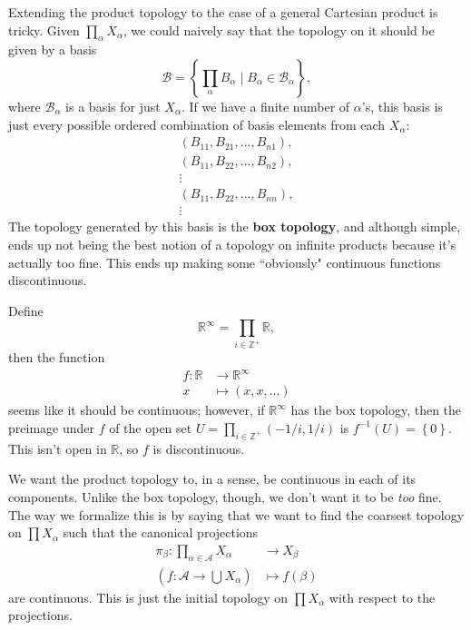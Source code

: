 \documentclass[twoside,10pt]{report}
\begin{document}
Extending the product topology to the case of a general Cartesian product is tricky. Given $\prod_{\alpha} X_{\alpha}$, we could naively say that the topology on it should be given by a basis
\[
	\mathcal{B} = \left\{ \prod_{\alpha}B_{\alpha}\;\Big|\; B_{\alpha} \in \mathcal{B}_{\alpha} \right\},
\] where $\mathcal{B}_{\alpha}$ is a basis for just $X_{\alpha}$. If we have a finite number of $\alpha$'s, this basis is just every possible ordered combination of basis elements from each $X_{\alpha}$:
\begin{gather*}
	(B_{11}, B_{21}, \dots, B_{n 1}), \\
	(B_{11}, B_{22}, \dots, B_{n 2}), \\
	\vdots \\
	(B_{11}, B_{22}, \dots, B_{n n}), \\
	\vdots
\end{gather*}The topology generated by this basis is the \textbf{box topology}, and although simple, ends up not being the best notion of a topology on infinite products because it's actually too fine. This ends up making some ``obviously" continuous functions discontinuous.

\begin{ex}[]
Define
\[
\mathbb{R}^{\infty}=\prod_{i \in \mathbb{Z}^{+}}\mathbb{R},
\] then the function
\begin{align*}
	f:\mathbb{R}&\to \mathbb{R}^{\infty}\\
	x&\mapsto (x,x,\dots)
\end{align*}
seems like it should be continuous; however, if $\mathbb{R}^{\infty}$ has the box topology, then the preimage under $f$ of the open set $U = \prod_{i \in \mathbb{Z}^{+}}(-1/i, 1/i)$ is $f^{-1}(U) = \left\{ 0 \right\}$. This isn't open in $\mathbb{R}$, so $f$ is discontinuous.
\end{ex}

We want the product topology to, in a sense, be continuous in each of its components. Unlike the box topology, though, we don't want it to be \textit{too} fine. The way we formalize this is by saying that we want to find the coarsest topology on $\prod X_{\alpha}$ such that the canonical projections
\begin{align*}
	\pi_{\beta}: \prod_{\alpha \in \mathcal{A}} X_{\alpha} &\to X_{\beta} \\
	(f:\mathcal{A}\to \bigcup_{}X_{\alpha}) &\mapsto f(\beta)
\end{align*}
are continuous. This is just the initial topology on $\prod X_{\alpha}$ with respect to the projections.
\end{document}
